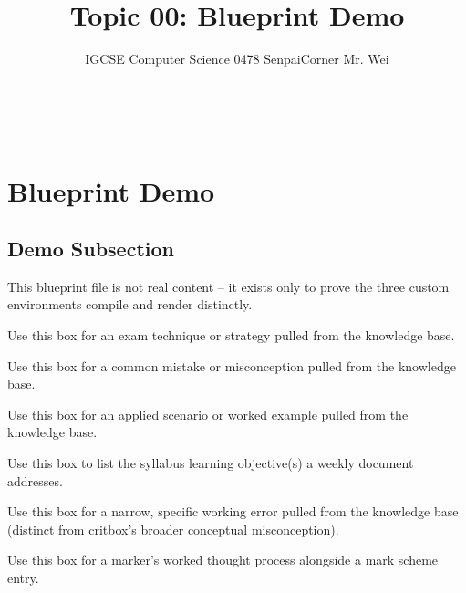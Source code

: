 \title{\textbf{Topic 00: Blueprint Demo}}\\[0.4em]  
\author{IGCSE Computer Science 0478 \textbar{} SenpaiCorner \textbar{} Mr. Wei}
\date{}
\maketitle

\section{Blueprint Demo}

\subsection{Demo Subsection}

This blueprint file is not real content -- it exists only to prove the three
custom environments compile and render distinctly.

\begin{stratbox}
Use this box for an exam technique or strategy pulled from the knowledge base.
\end{stratbox}

\begin{critbox}
Use this box for a common mistake or misconception pulled from the knowledge base.
\end{critbox}

\begin{scenario}
Use this box for an applied scenario or worked example pulled from the knowledge base.
\end{scenario}

\begin{learningoutcomes}
Use this box to list the syllabus learning objective(s) a weekly document addresses.
\end{learningoutcomes}

\begin{errortrap}
Use this box for a narrow, specific working error pulled from the knowledge base (distinct from critbox's broader conceptual misconception).
\end{errortrap}

\begin{modelans}
Use this box for a marker's worked thought process alongside a mark scheme entry.
\end{modelans}


